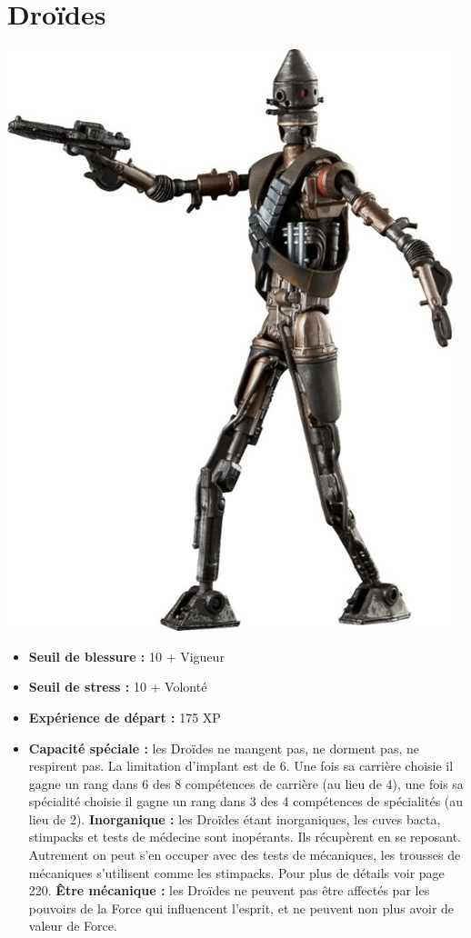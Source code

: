 \documentclass{article}
\begin{document}
\section*{Droïdes}
\noindent\begin{minipage}{0.3\textwidth}
	\includegraphics[width=1\linewidth]{../img/species/droid}
\end{minipage}
\hfill
\begin{minipage}{0.7\textwidth}\raggedleft
	\begin{itemize}
		\item \textbf{Seuil de blessure :} 10 + Vigueur 
		\item \textbf{Seuil de stress :} 10 + Volonté 
		\item \textbf{Expérience de départ :} 175 XP
		\item \textbf{Capacité spéciale :} les Droïdes ne mangent pas, ne dorment pas, ne respirent pas. La limitation d'implant est de 6. Une fois sa carrière choisie il gagne un rang dans 6 des 8 compétences de carrière (au lieu de 4), une fois sa spécialité choisie il gagne un rang dans 3 des 4 compétences de spécialités (au lieu de 2). \textbf{Inorganique :} les Droïdes étant inorganiques, les cuves bacta, stimpacks et tests de médecine sont inopérants. Ils récupèrent en se reposant. Autrement on peut s'en occuper avec des tests de mécaniques, les trousses de mécaniques s'utilisent comme les stimpacks. Pour plus de détails voir page 220. \textbf{Être mécanique : }les Droïdes ne peuvent pas être affectés par les pouvoirs de la Force qui influencent l'esprit, et ne peuvent non plus avoir de valeur de Force.
	\end{itemize}
\end{minipage}
\end{document}
